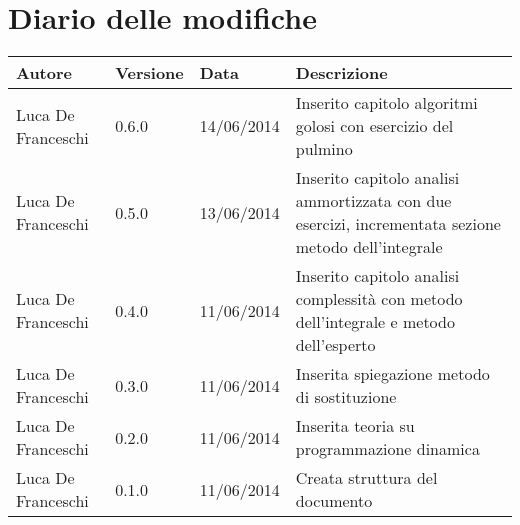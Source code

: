 \section*{Diario delle modifiche}

\begin{center}

	\begin{table}[htpd]
		\begin{tabular}{| l | l | l | p{50mm} |}
			\hline
			\hline
			\textbf{Autore} & \textbf{Versione} & \textbf{Data} & \textbf{Descrizione} \\
			\hline
			\hline
			Luca De Franceschi & 0.6.0 & 14/06/2014 & Inserito capitolo algoritmi golosi con esercizio del pulmino \\ \hline
			Luca De Franceschi & 0.5.0 & 13/06/2014 & Inserito capitolo analisi ammortizzata con due esercizi, incrementata sezione metodo dell'integrale \\ \hline
			Luca De Franceschi & 0.4.0 & 11/06/2014 & Inserito capitolo analisi complessità con metodo dell'integrale e metodo dell'esperto \\ \hline
			Luca De Franceschi & 0.3.0 & 11/06/2014 & Inserita spiegazione metodo di sostituzione \\ \hline
			Luca De Franceschi & 0.2.0 & 11/06/2014 & Inserita teoria su programmazione dinamica \\ \hline
			Luca De Franceschi & 0.1.0 & 11/06/2014 & Creata struttura del documento \\ \hline
		\end{tabular}
	\end{table}
	
\end{center}